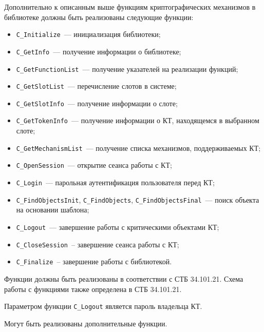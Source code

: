 Дополнительно к описанным выше функциям криптографических механизмов 
в библиотеке должны быть реализованы следующие функции:
\begin{itemize}
\item
\verb|C_Initialize|~--- инициализация библиотеки;
\item
\verb|C_GetInfo|~--- получение информации о библиотеке;
\item
\verb|C_GetFunctionList|~--- получение указателей на реализации функций;
\item
\verb|C_GetSlotList|~--- перечисление слотов в системе;
\item
\verb|C_GetSlotInfo|~--- получение информации о слоте;
\item
\verb|C_GetTokenInfo|~--- получение информации о КТ, находящемся в 
выбранном слоте;
\item
\verb|C_GetMechanismList|~--- 
получение списка механизмов, поддерживаемых КТ;
\item
\verb|C_OpenSession|~--- открытие сеанса работы с КТ;
\item
\verb|C_Login|~--- парольная аутентификация пользователя перед КТ;
\item
\verb|C_FindObjectsInit|, \verb|C_FindObjects|, 
\verb|C_FindObjectsFinal|~---
поиск объекта на основании шаблона;
\item
\verb|C_Logout|~--- завершение работы с критическими объектами КТ;
\item
\verb|C_CloseSession|~-- завершение сеанса работы с КТ;
\item
\verb|C_Finalize|~-- завершение работы с библиотекой.
\end{itemize}

Функции должны быть реализованы в соответствии с СТБ 34.101.21.
Схема работы с функциями также определена в СТБ 34.101.21.

Параметром функции \verb|C_Logout| является пароль владельца КТ.



Могут быть реализованы дополнительные функции. 


